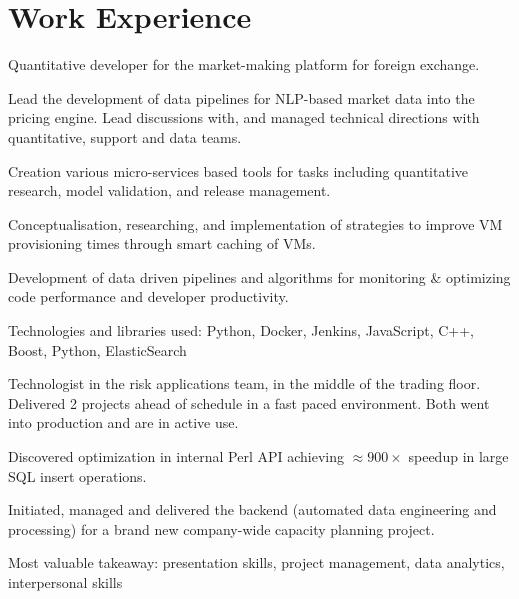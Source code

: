 \documentclass[]{deedy-resume-openfont}
\begin{document}
\section{Work Experience}
\hfill {}
\begin{tightemize}
    \item Quantitative developer for the market-making platform for foreign exchange.
    \item Lead the development of data pipelines for NLP-based market data into the pricing engine. Lead discussions with, and managed technical directions with quantitative, support and data teams.
	\item Creation various micro-services based tools for tasks including quantitative research, model validation, and release management.
    \item Conceptualisation, researching, and implementation of strategies to improve VM provisioning times through smart caching of VMs.
	\item Development of data driven pipelines and algorithms for monitoring \& optimizing code performance and developer productivity.
	\item Technologies and libraries used: Python, Docker, Jenkins, JavaScript, C++, Boost, Python, ElasticSearch
\end{tightemize}
\sectionsep
{}\hfill {}
\begin{tightemize}
    \item Technologist in the risk applications team, in the middle of the trading floor. Delivered 2 projects ahead of schedule in a fast paced environment. Both went into production and are in active use. 
	\item Discovered optimization in internal Perl API achieving $\approx 900 \times$ speedup in large SQL insert operations.
\end{tightemize}
\sectionsep
{}\hfill {}
\begin{tightemize}
	\item Initiated, managed and delivered the backend (automated data engineering and processing) for a brand new company-wide capacity planning project.
	\item Most valuable takeaway: presentation skills, project management, data analytics, interpersonal skills
\end{tightemize}
\sectionsep
\end{document}
